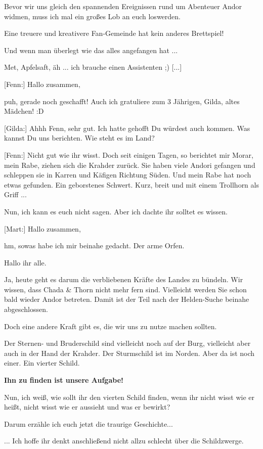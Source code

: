 \documentclass[10pt, a4paper, oneside]{book}
\begin{document}
\begin{multicols}{2}
Bevor wir uns gleich den spannenden Ereignissen rund um Abenteuer Andor widmen, muss ich mal ein großes Lob an euch loswerden.

Eine treuere und kreativere Fan-Gemeinde hat kein anderes Brettspiel!

Und wenn man überlegt wie das alles angefangen hat ...

Met, Apfelsaft, äh ... ich brauche einen Assistenten ;) [...]

[Fenn:] Hallo zusammen,

puh, gerade noch geschafft! Auch ich gratuliere zum 3 Jährigen, Gilda, altes Mädchen! :D

[Gilda:] Ahhh Fenn, sehr gut. Ich hatte gehofft Du würdest auch kommen. Was kannst Du uns berichten. Wie steht es im Land?

[Fenn:] Nicht gut wie ihr wisst. Doch seit einigen Tagen, so berichtet mir Morar, mein Rabe, ziehen sich die Krahder zurück. Sie haben viele Andori gefangen und schleppen sie in Karren und Käfigen Richtung Süden. Und mein Rabe hat noch etwas gefunden. Ein geborstenes Schwert. Kurz, breit und mit einem Trollhorn als Griff ...

Nun, ich kann es euch nicht sagen. Aber ich dachte ihr solltet es wissen.

[Mart:] Hallo zusammen,

hm, sowas habe ich mir beinahe gedacht. Der arme Orfen.

Hallo ihr alle.

Ja, heute geht es darum die verbliebenen Kräfte des Landes zu bündeln. Wir wissen, dass Chada \& Thorn nicht mehr fern sind. Vielleicht werden Sie schon bald wieder Andor betreten. Damit ist der Teil nach der Helden-Suche beinahe abgeschlossen.

Doch eine andere Kraft gibt es, die wir uns zu nutze machen sollten.

Der Sternen- und Bruderschild sind vielleicht noch auf der Burg, vielleicht aber auch in der Hand der Krahder. Der Sturmschild ist im Norden. Aber da ist noch einer. Ein vierter Schild.

\textbf{Ihn zu finden ist unsere Aufgabe!}

Nun, ich weiß, wie sollt ihr den vierten Schild finden, wenn ihr nicht wisst wie er heißt, nicht wisst wie er aussieht und was er bewirkt?

Darum erzähle ich euch jetzt die traurige Geschichte...

... Ich hoffe ihr denkt anschließend nicht allzu schlecht über die Schildzwerge.


\end{multicols}
\end{document}
